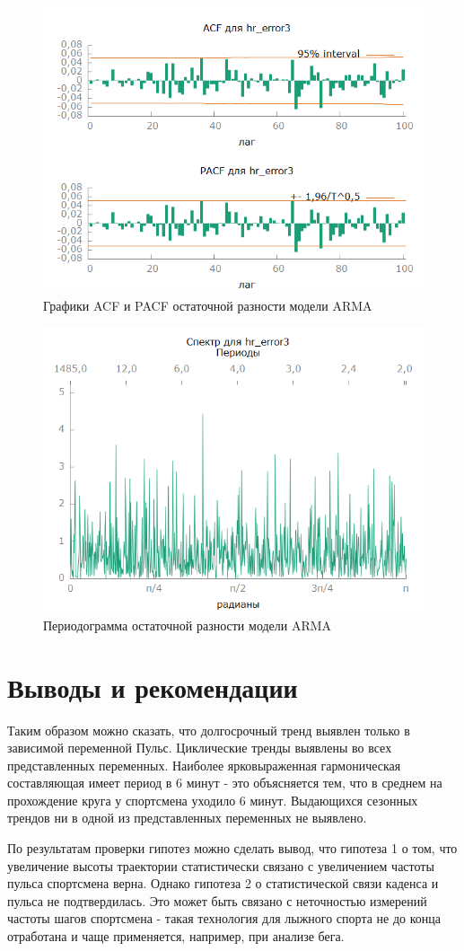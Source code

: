 \documentclass[a4paper,12pt]{article}
\begin{document}
\begin{figure}[H]
	\centering
	\includegraphics[width=0.5\linewidth]{../[graphics]/hr_error3_acf_100.png}
	\caption{Графики ACF и PACF остаточной разности модели ARMA}
	\label{fig:hr_error3_acf_100}
\end{figure}

\begin{figure}[H]
	\centering
	\includegraphics[width=0.5\linewidth]{../[graphics]/hr_error3_spectr.png}
	\caption{Периодограмма остаточной разности модели ARMA}
	\label{fig:hr_error3_spectr}
\end{figure}


\section{Выводы и рекомендации}
Таким образом можно сказать, что долгосрочный тренд выявлен только в зависимой переменной Пульс. Циклические тренды выявлены во всех представленных переменных. Наиболее ярковыраженная гармоническая составляющая имеет период в 6 минут - это объясняется тем, что в среднем на прохождение круга у спортсмена уходило 6 минут. Выдающихся сезонных трендов ни в одной из представленных переменных не выявлено.  

По результатам проверки гипотез можно сделать вывод, что гипотеза 1 о том, что увеличение высоты траектории статистически связано с увеличением частоты пульса спортсмена верна. Однако гипотеза 2 о статистической связи каденса и пульса не подтвердилась. Это может быть связано с неточностью измерений частоты шагов спортсмена - такая технология для лыжного спорта не до конца отработана и чаще применяется, например, при анализе бега.
\end{document}

